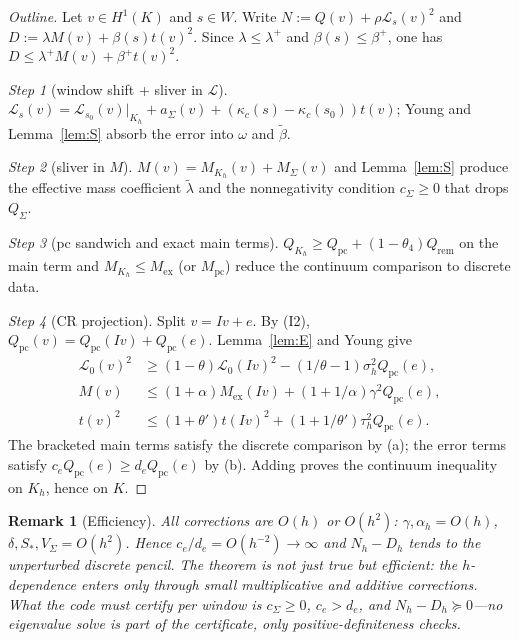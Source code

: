 \documentclass[11pt]{amsart}
\newtheorem{remark}[theorem]{Remark}
\begin{document}
\begin{proof}[Outline]
Let $v\in H^1(K)$ and $s\in W$.  Write $N:=Q(v)+\rho\mathcal{L}_s(v)^2$ and
$D:=\lambda M(v)+\beta(s)t(v)^2$.  Since $\lambda\le\lambda^+$ and
$\beta(s)\le\beta^+$, one has $D\le\lambda^+ M(v)+\beta^+ t(v)^2$.

\emph{Step 1} (window shift + sliver in $\mathcal{L}$).
$\mathcal{L}_s(v)=\mathcal{L}_{s_0}(v)|_{K_h}+a_\Sigma(v)
+(\kappa_c(s)-\kappa_c(s_0))t(v)$; Young and Lemma~\ref{lem:S} absorb the
error into $\omega$ and $\tilde\beta$.

\emph{Step 2} (sliver in $M$).  $M(v)=M_{K_h}(v)+M_\Sigma(v)$ and
Lemma~\ref{lem:S} produce the effective mass coefficient $\tilde\lambda$
and the nonnegativity condition $c_\Sigma\ge 0$ that drops $Q_\Sigma$.

\emph{Step 3} (pc sandwich and exact main terms).
$Q_{K_h}\ge Q_{\mathrm{pc}}+(1-\theta_4)Q_{\mathrm{rem}}$ on the main term
and $M_{K_h}\le M_{\mathrm{ex}}$ (or $M_{\mathrm{pc}}$) reduce the continuum
comparison to discrete data.

\emph{Step 4} (CR projection).  Split $v=Iv+e$.  By (I2),
$Q_{\mathrm{pc}}(v)=Q_{\mathrm{pc}}(Iv)+Q_{\mathrm{pc}}(e)$.  Lemma~\ref{lem:E}
and Young give
\begin{align*}
  \mathcal{L}_0(v)^2&\ge(1-\theta)\mathcal{L}_0(Iv)^2
    -(1/\theta-1)\sigma_h^2 Q_{\mathrm{pc}}(e),\\
  M(v)&\le(1+\alpha)M_{\mathrm{ex}}(Iv)
    +(1+1/\alpha)\gamma^2 Q_{\mathrm{pc}}(e),\\
  t(v)^2&\le(1+\theta')t(Iv)^2+(1+1/\theta')\tau_h^2 Q_{\mathrm{pc}}(e).
\end{align*}
The bracketed main terms satisfy the discrete comparison by (a); the
error terms satisfy $c_e Q_{\mathrm{pc}}(e)\ge d_e Q_{\mathrm{pc}}(e)$ by
(b).  Adding proves the continuum inequality on $K_h$, hence on $K$.
\end{proof}

\begin{remark}[Efficiency]
All corrections are $O(h)$ or $O(h^2)$: $\gamma,\alpha_h=O(h)$,
$\delta,S_*,V_\Sigma=O(h^2)$.  Hence $c_e/d_e=O(h^{-2})\to\infty$ and
$N_h-D_h$ tends to the unperturbed discrete pencil.  The theorem is not
just true but efficient: the $h$-dependence enters only through small
multiplicative and additive corrections.  What the code must certify per
window is $c_\Sigma\ge 0$, $c_e>d_e$, and $N_h-D_h\succeq 0$---no eigenvalue
\emph{solve} is part of the certificate, only positive-definiteness
checks.
\end{remark}
\end{document}
